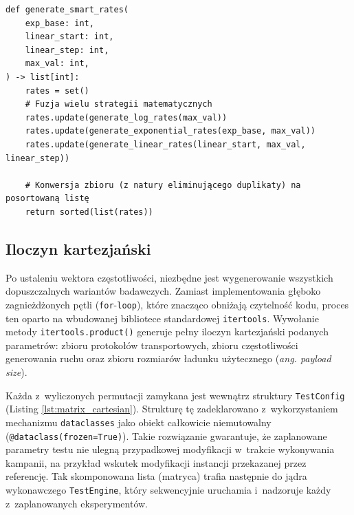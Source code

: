 \begin{listing}[htbp]
    \caption{Hybrydowy algorytm przemiatania częstotliwości automatycznie eliminujący duplikaty pomiarowe z~wykorzystaniem zbiorów (\texttt{matrix.py}) \cite{espy_nexus_python_host}.}
    \label{lst:matrix_smart}
    \begin{verbatim}
def generate_smart_rates(
    exp_base: int,
    linear_start: int,
    linear_step: int,
    max_val: int,
) -> list[int]:
    rates = set()
    # Fuzja wielu strategii matematycznych
    rates.update(generate_log_rates(max_val))
    rates.update(generate_exponential_rates(exp_base, max_val))
    rates.update(generate_linear_rates(linear_start, max_val, linear_step))

    # Konwersja zbioru (z natury eliminującego duplikaty) na posortowaną listę
    return sorted(list(rates))
\end{verbatim}
\end{listing}

\subsection{Iloczyn kartezjański}

Po ustaleniu wektora częstotliwości, niezbędne jest wygenerowanie wszystkich dopuszczalnych wariantów badawczych.
Zamiast implementowania głęboko zagnieżdżonych pętli (\texttt{for}-\texttt{loop}), które znacząco obniżają czytelność kodu, proces ten oparto na wbudowanej bibliotece standardowej \texttt{itertools}.
Wywołanie metody \texttt{itertools.product()} generuje pełny iloczyn kartezjański podanych parametrów: zbioru protokołów transportowych, zbioru częstotliwości generowania ruchu oraz zbioru rozmiarów ładunku użytecznego (\textit{ang. payload size}).

Każda z~wyliczonych permutacji zamykana jest wewnątrz struktury \texttt{TestConfig} (Listing \ref{lst:matrix_cartesian}).
Strukturę tę zadeklarowano z~wykorzystaniem mechanizmu \texttt{dataclasses} jako obiekt całkowicie niemutowalny (\texttt{@dataclass(frozen=True)}).
Takie rozwiązanie gwarantuje, że zaplanowane parametry testu nie ulegną przypadkowej modyfikacji w~trakcie wykonywania kampanii, na przykład wskutek modyfikacji instancji przekazanej przez referencję.
Tak skomponowana lista (matryca) trafia następnie do jądra wykonawczego \texttt{TestEngine}, który sekwencyjnie uruchamia i~nadzoruje każdy z~zaplanowanych eksperymentów.

